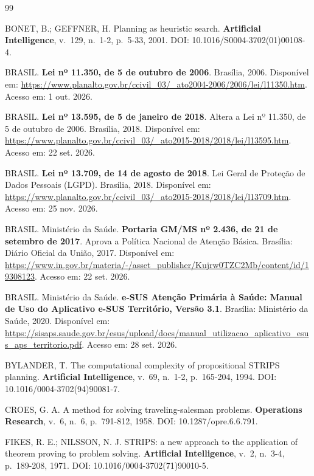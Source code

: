 \documentclass[11pt,a4paper]{article}
\begin{document}
\begin{thebibliography}{99}

BONET, B.; GEFFNER, H. Planning as heuristic search. \textbf{Artificial Intelligence}, v.~129, n.~1-2, p.~5-33, 2001. DOI: 10.1016/S0004-3702(01)00108-4.

BRASIL. \textbf{Lei nº 11.350, de 5 de outubro de 2006}. Brasília, 2006. Disponível em: \url{https://www.planalto.gov.br/ccivil_03/_ato2004-2006/2006/lei/l11350.htm}. Acesso em: 1 out. 2026.

BRASIL. \textbf{Lei nº 13.595, de 5 de janeiro de 2018}. Altera a Lei nº 11.350, de 5 de outubro de 2006. Brasília, 2018. Disponível em: \url{https://www.planalto.gov.br/ccivil_03/_ato2015-2018/2018/lei/l13595.htm}. Acesso em: 22 set. 2026.

BRASIL. \textbf{Lei nº 13.709, de 14 de agosto de 2018}. Lei Geral de Proteção de Dados Pessoais (LGPD). Brasília, 2018. Disponível em: \url{https://www.planalto.gov.br/ccivil_03/_ato2015-2018/2018/lei/l13709.htm}. Acesso em: 25 nov. 2026.

BRASIL. Ministério da Saúde. \textbf{Portaria GM/MS nº 2.436, de 21 de setembro de 2017}. Aprova a Política Nacional de Atenção Básica. Brasília: Diário Oficial da União, 2017. Disponível em: \url{https://www.in.gov.br/materia/-/asset_publisher/Kujrw0TZC2Mb/content/id/19308123}. Acesso em: 22 set. 2026.

BRASIL. Ministério da Saúde. \textbf{e-SUS Atenção Primária à Saúde: Manual de Uso do Aplicativo e-SUS Território, Versão 3.1}. Brasília: Ministério da Saúde, 2020. Disponível em: \url{https://sisaps.saude.gov.br/esus/upload/docs/manual_utilizacao_aplicativo_esus_aps_territorio.pdf}. Acesso em: 28 set. 2026.

BYLANDER, T. The computational complexity of propositional STRIPS planning. \textbf{Artificial Intelligence}, v.~69, n.~1-2, p.~165-204, 1994. DOI: 10.1016/0004-3702(94)90081-7.

CROES, G. A. A method for solving traveling-salesman problems. \textbf{Operations Research}, v.~6, n.~6, p.~791-812, 1958. DOI: 10.1287/opre.6.6.791.

FIKES, R. E.; NILSSON, N. J. STRIPS: a new approach to the application of theorem proving to problem solving. \textbf{Artificial Intelligence}, v.~2, n.~3-4, p.~189-208, 1971. DOI: 10.1016/0004-3702(71)90010-5.


\end{thebibliography}
\end{document}
